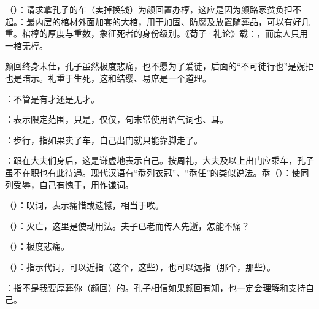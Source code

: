 {
\item {}（）：请求拿孔子的车（卖掉换钱）为颜回置办椁，这应是因为颜路家贫负担不起。：最内层的棺材外面加套的大棺，用于加固、防腐及放置随葬品，可以有好几重。棺椁的厚度与重数，象征死者的身份级别。《荀子·礼论》载：，而庶人只用一棺无椁。

颜回终身未仕，孔子虽然极度悲痛，也不愿为了爱徒，后面的“不可徒行也”是婉拒也是暗示。礼重于生死，这和结缨、易席是一个道理。
\item {}：不管是有才还是无才。
\item {}：表示限定范围，只是，仅仅，句末常使用语气词也、耳。
\item {}：步行，指如果卖了车，自己出门就只能靠脚走了。
\item {}：跟在大夫们身后，这是谦虚地表示自己。按周礼，大夫及以上出门应乘车，孔子虽不在职也有此待遇。现代汉语有“忝列衣冠”、“忝任”的类似说法。忝（）：使同列受辱，自己有愧于，用作谦词。
}
{}


{
\item {}（）：叹词，表示痛惜或遗憾，相当于唉。
\item {}（）：灭亡，这里是使动用法。夫子已老而传人先逝，怎能不痛？ %
}
{}


{
\item {}（）：极度悲痛。
\item {}（）：指示代词，可以近指（这个，这些），也可以远指（那个，那些）。
}
{}


{
\item {}：指不是我要厚葬你（颜回）的。孔子相信如果颜回有知，也一定会理解和支持自己。
}
{}


